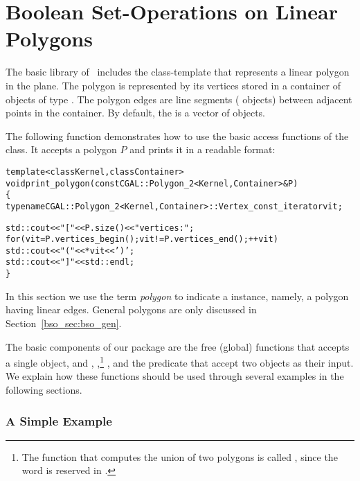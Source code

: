 \section{Boolean Set-Operations on Linear Polygons\label{bso_sec:bso_lin}}

The basic library of \cgal\ includes the 
class-template that represents a linear polygon in the plane. The
polygon is represented by its vertices stored in a container of
objects of type . The polygon edges are line
segments ( objects) between adjacent points in
the container. By default, the  is a vector of
 objects.

The following function demonstrates how to use the basic access
functions of the  class. It accepts a polygon $P$ and
prints it in a readable format:
\begin{alltt}
template<class Kernel, class Container>
void print_polygon (const CGAL::Polygon_2<Kernel, Container>& P)
\{
  typename CGAL::Polygon_2<Kernel, Container>::Vertex_const_iterator  vit;

  std::cout << "[ " << P.size() << " vertices:";
  for (vit = P.vertices_begin(); vit != P.vertices_end(); ++vit)
    std::cout << " (" << *vit << ')';
  std::cout << " ]" << std::endl;
\}
\end{alltt}

In this section we use the term {\em polygon} to indicate a
 instance, namely, a polygon having linear
edges. General polygons are only discussed in
Section~\ref{bso_sec:bso_gen}.

The basic components of our package are the free (global) functions
 that accepts a single  object, and
, ,\footnote{The function that
computes the union of two polygons is called , since
the word  is reserved in \CC.} ,
 and the predicate 
that accept two  objects as their input. We explain how
these functions should be used through several examples in the
following sections.

\subsubsection*{A Simple Example}

